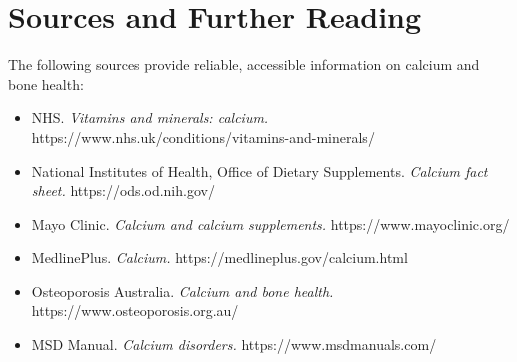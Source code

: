 \section*{Sources and Further Reading}
The following sources provide reliable, accessible information on calcium and bone health:
\begin{itemize}
    \item NHS. \textit{Vitamins and minerals: calcium.} https://www.nhs.uk/conditions/vitamins-and-minerals/
    \item National Institutes of Health, Office of Dietary Supplements. \textit{Calcium fact sheet.} https://ods.od.nih.gov/
    \item Mayo Clinic. \textit{Calcium and calcium supplements.} https://www.mayoclinic.org/
    \item MedlinePlus. \textit{Calcium.} https://medlineplus.gov/calcium.html
    \item Osteoporosis Australia. \textit{Calcium and bone health.} https://www.osteoporosis.org.au/
    \item MSD Manual. \textit{Calcium disorders.} https://www.msdmanuals.com/
\end{itemize}
